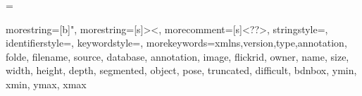 \RequirePackage[labelsep=space,tableposition=top]{caption}
\renewcommand{\figurename}{\bfseries Gambar } %
\renewcommand{\tablename}{\bfseries Tabel }





\usepackage{subcaption}

\usepackage{booktabs} %
\usepackage{multirow}
\usepackage[table]{xcolor}

\usepackage{multicol}
\usepackage{tabularx}


\usepackage{siunitx} %

\emergencystretch=\maxdimen
{}

\usepackage{listings}

\usepackage{color}


{
  morestring=[b]",
  morestring=[s]{>}{<},
  morecomment=[s]{<?}{?>},
  stringstyle=\color{black},
  identifierstyle=\color{darkblue},
  keywordstyle=\color{cyan},
  morekeywords={xmlns,version,type,annotation, folde, filename, source, database, annotation, image, flickrid, owner, name, size, width, height, depth, segmented, object, pose, truncated, difficult, bdnbox, ymin, xmin, ymax, xmax}%
}

